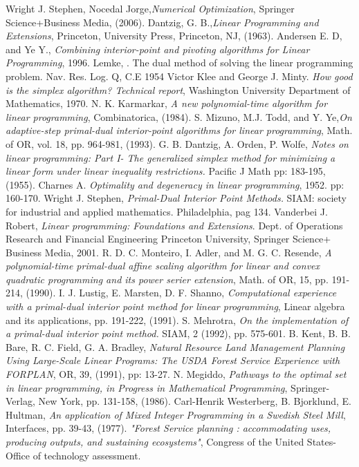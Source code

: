 \documentclass[a4paper,10 pt,titlepage,twoside]{book}
\theoremstyle{plain}
\theoremstyle{definition}
\theoremstyle{remark}
\begin{document}
\begin{thebibliography}{9}
	Wright J. Stephen, Nocedal Jorge,\emph{\;Numerical Optimization}, Springer Science+Business Media, (2006).
	Dantzig, G. B.,\emph{\;Linear Programming and Extensions}, Princeton, University Press, Princeton, NJ, (1963).
	 Andersen E. D, and Ye Y.,  \textit{Combining interior-point and pivoting algorithms for Linear Programming}, 1996.
	 Lemke, . The dual method of solving the linear programming problem. Nav. Res. Log. Q, C.E 1954
	Victor Klee and George J. Minty.\emph{ How good is the simplex algorithm? Technical report}, Washington University Department of Mathematics, 1970.
	 N. K. Karmarkar,\emph{ A new polynomial-time algorithm for linear programming}, Combinatorica, (1984).
	 S. Mizuno, M.J. Todd, and Y. Ye,\emph{\;On adaptive-step primal-dual interior-point algorithms for linear programming}, Math. of OR, vol. 18, pp. 964-981, (1993). 
	 G. B. Dantzig, A. Orden, P. Wolfe, \emph{ Notes on linear programming: Part I- The generalized simplex method for
	minimizing a linear form under linear inequality restrictions.} Pacific J Math pp: 183-195, (1955). 
	  Charnes A. \emph{ Optimality and degeneracy in linear programming}, 1952. pp: 160-170. 
	 Wright J. Stephen, \emph{\;Primal-Dual Interior Point Methods.} SIAM: society for industrial and applied mathematics. Philadelphia, pag 134.
	 Vanderbei J. Robert, \emph{\;Linear programming:
		Foundations and Extensions}. Dept. of Operations Research and Financial Engineering
	Princeton University, Springer Science+ Business Media, 2001.
	 R. D. C. Monteiro, I. Adler, and M. G. C. Resende, \emph{A polynomial-time primal-dual affine scaling algorithm for linear and convex quadratic programming and its power serier extension}, Math. of OR, 15, pp. 191-214, (1990).
	 I. J. Lustig, E. Marsten, D. F. Shanno, \emph{Computational experience with a primal-dual interior point method for linear programming}, Linear algebra and its applications, pp. 191-222, (1991).
	 S. Mehrotra, \emph{ On the implementation of a primal-dual interior point method. } SIAM, 2 (1992), pp. 575-601.
	 B. Kent, B. B. Bare, R. C. Field, G. A. Bradley, \textit{Natural Resource Land Management Planning Using Large-Scale Linear Programs: The USDA Forest Service Experience with FORPLAN}, OR, 39, (1991), pp: 13-27.
 N. Megiddo, \emph{ Pathways to the optimal set in linear programming, in Progress in
Mathematical Programming}, Springer-Verlag, New York, pp. 131-158, (1986).
 Carl-Henrik Westerberg, B. Bjorklund, E. Hultman, \emph{ An application of Mixed Integer Programming in a Swedish Steel Mill}, Interfaces, pp. 39-43, (1977).
 \emph{"Forest Service planning : accommodating uses, producing outputs, and sustaining ecosystems"}, Congress of the United States-Office of technology assessment. 
\end{thebibliography}
\end{document}
